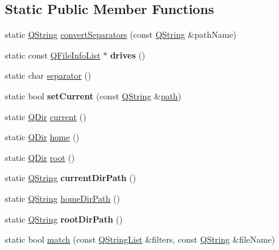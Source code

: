 \subsection*{Static Public Member Functions}
\begin{DoxyCompactItemize}
\item 
static \mbox{\hyperlink{class_q_string}{Q\+String}} \mbox{\hyperlink{class_q_dir_a2cb829f147b7225abab1e5915ae62264}{convert\+Separators}} (const \mbox{\hyperlink{class_q_string}{Q\+String}} \&path\+Name)
\item 
\mbox{\label{class_q_dir_a549c0fc27cf5b4b24310558fe477e178}} 
static const \mbox{\hyperlink{class_q_internal_list}{Q\+File\+Info\+List}} $\ast$ {\bfseries drives} ()
\item 
static char \mbox{\hyperlink{class_q_dir_a8e851d9a1f839208ef0141fde43b414d}{separator}} ()
\item 
\mbox{\label{class_q_dir_a61b45775b8b1e2d9ebe069e481f5dc9d}} 
static bool {\bfseries set\+Current} (const \mbox{\hyperlink{class_q_string}{Q\+String}} \&\mbox{\hyperlink{class_q_dir_a6258e0803c991909e0ce38e40f6f07ec}{path}})
\item 
static \mbox{\hyperlink{class_q_dir}{Q\+Dir}} \mbox{\hyperlink{class_q_dir_a697f013a5d4ae0c805546a2dd8f55707}{current}} ()
\item 
static \mbox{\hyperlink{class_q_dir}{Q\+Dir}} \mbox{\hyperlink{class_q_dir_ab3881e8a981cc34ede0e6e57a1135c20}{home}} ()
\item 
static \mbox{\hyperlink{class_q_dir}{Q\+Dir}} \mbox{\hyperlink{class_q_dir_a61d528e4d5689e81d9c27d68dbd19f64}{root}} ()
\item 
\mbox{\label{class_q_dir_a987a313fb7600142ed761109991f5a8c}} 
static \mbox{\hyperlink{class_q_string}{Q\+String}} {\bfseries current\+Dir\+Path} ()
\item 
static \mbox{\hyperlink{class_q_string}{Q\+String}} \mbox{\hyperlink{class_q_dir_ac112ea98a56191b8b0d84cd967472b39}{home\+Dir\+Path}} ()
\item 
\mbox{\label{class_q_dir_a66d4102cf6087d51057f8fbd0028def9}} 
static \mbox{\hyperlink{class_q_string}{Q\+String}} {\bfseries root\+Dir\+Path} ()
\item 
static bool \mbox{\hyperlink{class_q_dir_aa78de265f6e5e198a90b4d0252a42df3}{match}} (const \mbox{\hyperlink{class_q_string_list}{Q\+String\+List}} \&filters, const \mbox{\hyperlink{class_q_string}{Q\+String}} \&file\+Name)

\end{DoxyCompactItemize}
